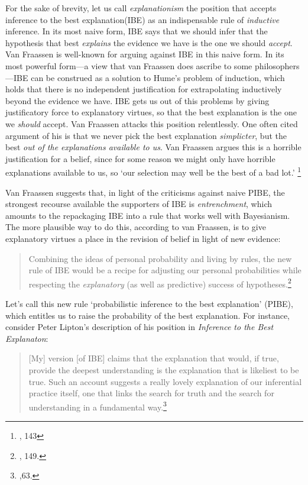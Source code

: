 For the sake of brevity, let us call \emph{explanationism} the position
that accepts  inference to the best explanation(IBE) as an indispensable
rule of \emph{inductive} inference. In its most naive form, IBE says
that we should infer that the hypothesis that best \emph{explains} the
evidence we have is the one we should \emph{accept}. Van Fraassen is
well-known for arguing against IBE in this naive form. In
its most powerful form---a view that van Fraassen does ascribe
to some philosophers---IBE can be construed as a solution to Hume's
problem of induction, which holds that there is no independent
justification for extrapolating inductively beyond the evidence we have.
IBE gets us out of this problems by giving justificatory force to
explanatory virtues, so that the best explanation is the one we
\emph{should} accept. Van Fraassen attacks this position relentlessly.
One often cited argument of his is that we never pick the best
explanation \emph{simplicter}, but the best \emph{out of the
explanations available to us}. Van Fraassen argues this is a horrible
justification for a belief, since for some reason we might only have
horrible explanations available to us, so `our selection may well be the
best of a bad lot.' \footnote{\cite{bvfsi}, 143}

Van Fraassen suggests that, in light of the criticisms against naive PIBE, the strongest recourse available the
supporters of IBE is \emph{entrenchment}, which amounts to the
repackaging IBE into a rule that works well with Bayesianism. The more
plausible way to do this, according to van Fraassen, is to give
explanatory virtues a place in the revision of belief in light of new
evidence:

\begin{quote}
Combining the ideas of personal probability and living by rules, the new
rule of IBE would be a recipe for adjusting our personal probabilities
while respecting the \emph{explanatory} (as well as predictive) success
of hypotheses.\footnote{\cite{bvflaws}, 149.}
\end{quote}

Let's call this new rule `probabilistic inference to the best
explanation' (PIBE), which entitles us to raise the probability of the
best explanation. For instance, consider Peter Lipton's description of his position in \emph{Inference to the Best Explanaton}:

\begin{quote}
{[}My{]} version {[}of IBE{]} claims that the explanation that would, if
true, provide the deepest understanding is the explanation that is
likeliest to be true. Such an account suggests a really lovely
explanation of our inferential practice itself, one that links the
search for truth and the search for understanding in a fundamental way.\footnote{\cite{lipton},63.}
\end{quote}

